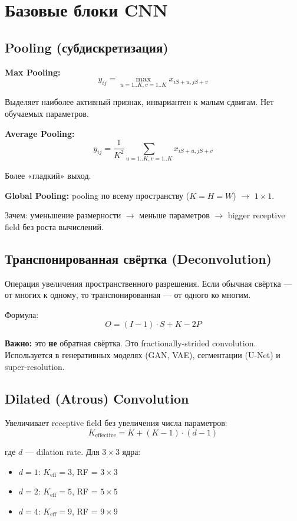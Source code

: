 \documentclass[a4paper,12pt]{article}
\begin{document}
\section{Базовые блоки CNN}

\subsection{Pooling (субдискретизация)}

\textbf{Max Pooling:}
\[
y_{ij} = \max_{u=1..K, v=1..K} x_{iS+u, jS+v}
\]

Выделяет наиболее активный признак, инвариантен к малым сдвигам. Нет обучаемых параметров.

\textbf{Average Pooling:}
\[
y_{ij} = \frac{1}{K^2} \sum_{u=1..K, v=1..K} x_{iS+u, jS+v}
\]

Более «гладкий» выход.

\textbf{Global Pooling:} pooling по всему пространству ($K = H = W$) $\to$ $1 \times 1$.

Зачем: уменьшение размерности $\to$ меньше параметров $\to$ bigger receptive field без роста вычислений.

\subsection{Транспонированная свёртка (Deconvolution)}

Операция увеличения пространственного разрешения. Если обычная свёртка — от многих к одному, то транспонированная — от одного ко многим.

Формула:
\[
O = (I - 1) \cdot S + K - 2P
\]

\textbf{Важно:} это \textbf{не} обратная свёртка. Это fractionally-strided convolution. Используется в генеративных моделях (GAN, VAE), сегментации (U-Net) и super-resolution.

\subsection{Dilated (Atrous) Convolution}

Увеличивает receptive field без увеличения числа параметров:
\[
K_{\text{effective}} = K + (K - 1) \cdot (d - 1)
\]

где $d$ — dilation rate. Для $3 \times 3$ ядра:
\begin{itemize}
    \item $d = 1$: $K_{\text{eff}} = 3$, RF = $3 \times 3$
    \item $d = 2$: $K_{\text{eff}} = 5$, RF = $5 \times 5$
    \item $d = 4$: $K_{\text{eff}} = 9$, RF = $9 \times 9$
\end{itemize}
\end{document}

